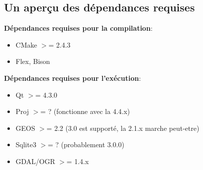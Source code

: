 
%
%
%
%

\subsection{Un aperçu des dépendances requises}

\textbf{Dépendances requises pour la compilation}:

\begin{itemize}
\item CMake $>$= 2.4.3
\item Flex, Bison
\end{itemize}

\textbf{Dépendances requises pour l'exécution}:

\begin{itemize}
\item Qt $>$= 4.3.0
\item Proj $>$= ? (fonctionne avec la 4.4.x)
\item GEOS $>$= 2.2 (3.0 est supporté, la 2.1.x marche peut-etre)
\item Sqlite3 $>$= ? (probablement 3.0.0)
\item GDAL/OGR $>$= 1.4.x
\end{itemize}

